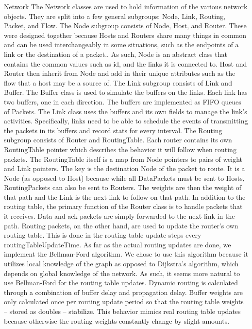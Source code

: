 Network
    The Network classes are used to hold information of the various network objects. They are split into a few general subgroups: Node, Link, Routing, Packet, and Flow.
The Node subgroup consists of Node, Host, and Router. These were designed together because Hosts and Routers share many things in common and can be used interchangeably in some situations, such as the endpoints of a link or the destination of a packet.. As such, Node is an abstract class that contains the common values such as id, and the links it is connected to. Host and Router then inherit from Node and add in their unique attributes such as the flow that a host may be a source of.
    The Link subgroup consists of Link and Buffer. The Buffer class is used to simulate the buffers on the links. Each link has two buffers, one in each direction. The buffers are implemented as FIFO queues of Packets. The Link class uses the buffers and its own fields to manage the link’s activities. Specifically, links need to be able to schedule the events of transmitting the packets in its buffers and record stats for every interval.
    The Routing subgroup consists of Router and RoutingTable. Each router contains its own RoutingTable pointer which describes the behavior it will follow when routing packets. The RoutingTable itself is a map from Node pointers to pairs of weight and Link pointers. The key is the destination Node of the packet to route. It is a Node (as opposed to Host) because while all DataPackets must be sent to Hosts, RoutingPackets can also be sent to Routers. The weights are then the weight of that path and the Link is the next link to follow on that path. In addition to the routing table, the primary function of the Router class is to handle packets that it receives. Data and ack packets are simply forwarded to the next link in the path. Routing packets, on the other hand, are used to update the router’s own routing table. This is done in the routing table update steps every routingTableUpdateTime. 
As far as the actual routing updates are done, we implement the Bellman-Ford algorithm. We chose to use this algorithm because it utilizes local knowledge of the graph as opposed to Dijkstra’s algorithm, which depends on global knowledge of the network. As such, it seems more natural to use Bellman-Ford for the routing table updates. Dynamic routing is calculated through a combination of buffer delay and propagation delay. Buffer weights are only calculated once per routing update period so that the routing table weights -- stored as doubles -- stabilize. This behavior mimics real routing table updates because otherwise the routing weights constantly change by slight amounts.
